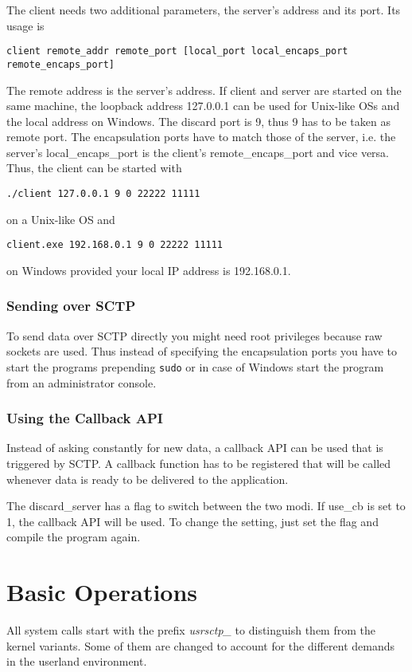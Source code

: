 \documentclass[a4paper]{article}
\begin{document}
The client needs two additional parameters, the server's address and its port.
Its usage is
\begin{verbatim}
client remote_addr remote_port [local_port local_encaps_port remote_encaps_port]
\end{verbatim}
The remote address is the server's address. If client and server are started on the same machine,
the loopback address 127.0.0.1 can be used for Unix-like OSs and the local address on Windows.
The discard port is 9, thus 9 has to be taken as remote port. The encapsulation ports have to
match those of the server, i.e. the server's local\_encaps\_port is the client's
remote\_encaps\_port and vice versa. Thus, the client can be started with
\begin{verbatim}
./client 127.0.0.1 9 0 22222 11111
\end{verbatim}
on a Unix-like OS and
\begin{verbatim}
client.exe 192.168.0.1 9 0 22222 11111
\end{verbatim}
on Windows provided your local IP address is 192.168.0.1.

\subsubsection{Sending over SCTP}
To send data over SCTP directly you might need root privileges because raw sockets are used.
Thus instead of specifying the encapsulation ports you have to start the programs prepending 
\texttt{sudo} or in case of Windows start the program from an administrator console.

\subsubsection{Using the Callback API}
Instead of asking constantly for new data, a callback API can be used that is triggered by 
SCTP. A callback function has to be registered that will be called whenever data is ready to
be delivered to the application.

The discard\_server has a flag to switch between the two modi. If  use\_cb is set to 1, the
callback API will be used. To change the setting, just set the flag and compile the program again.




\section{Basic Operations}
All system calls start with the prefix \textit{usrsctp\_} to distinguish them from the kernel variants. 
Some of them are changed to account for the different demands in the userland environment. 
\end{document}
